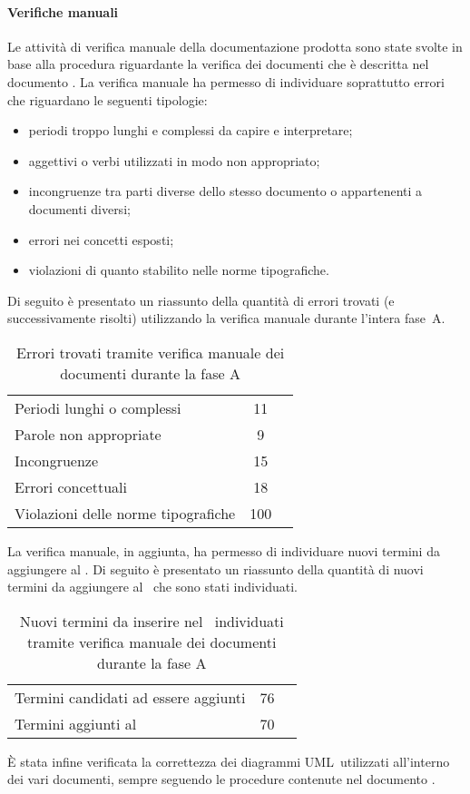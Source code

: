 \documentclass[../PianoDiQualifica.tex]{subfiles}
\begin{document}
\begin{appendices}
			\paragraph{Verifiche manuali}
			Le attività di verifica manuale della documentazione prodotta sono state svolte in base alla procedura riguardante la verifica dei documenti che è descritta nel documento \normediprogetto. La verifica manuale ha permesso di individuare soprattutto errori che riguardano le seguenti tipologie:
			\begin{itemize}
				\item periodi troppo lunghi e complessi da capire e interpretare;
				\item aggettivi o verbi utilizzati in modo non appropriato;
				\item incongruenze tra parti diverse dello stesso documento o appartenenti a documenti diversi;
				\item errori nei concetti esposti;
				\item violazioni di quanto stabilito nelle norme tipografiche.
			\end{itemize}
			Di seguito è presentato un riassunto della quantità di errori trovati (e successivamente risolti) utilizzando la verifica manuale durante l'intera fase\g\ A.
\begin{table}[H]
		\centering
		\begin{tabular}{l * {2}{c}}
			\midrule
			Periodi lunghi o complessi &	11 \\
			Parole non appropriate & 9 \\
			Incongruenze & 15 \\
			Errori concettuali & 18 \\
			Violazioni delle norme tipografiche & 100 \\
			\midrule
		\end{tabular}
		\caption{Errori trovati tramite verifica manuale dei documenti durante la fase A}
		\label{tab:errori_manuale}
\end{table}
			La verifica manuale, in aggiunta, ha permesso di individuare nuovi termini da aggiungere al \glossario. Di seguito è presentato un riassunto della quantità di nuovi termini da aggiungere al \glossario\ che sono stati individuati.
\begin{table}[H]
		\centering
		\begin{tabular}{l * {2}{c}}
			\midrule
			Termini candidati ad essere aggiunti &	76 \\
			Termini aggiunti al \glossario & 70 \\
			\midrule
		\end{tabular}
		\caption{Nuovi termini da inserire nel \glossario\ individuati tramite verifica manuale dei documenti durante la fase A}
		\label{tab:termini_glossario}
\end{table}	
			È stata infine verificata la correttezza dei diagrammi UML\g\ utilizzati all'interno dei vari documenti, sempre seguendo le procedure contenute nel documento \normediprogetto.

\end{appendices}
\end{document}
